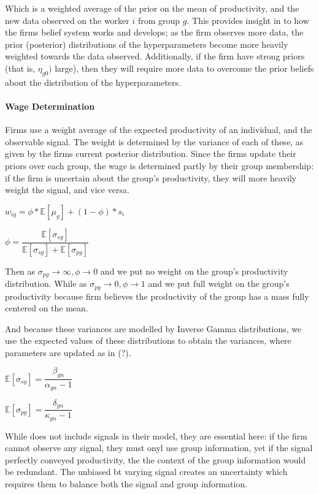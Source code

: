 \documentclass[]{article}
\begin{document}
Which is a weighted average of the prior on the mean of productivity, and the new data observed on the worker $i$ from group $g$. This provides insight in to how the firms belief system works and develops; as the firm observes more data, the prior (posterior) distributions of the hyperparameters become more heavily weighted towards the data observed. Additionally, if the firm have strong priors (that is, $\eta_{g0})$ large), then they will require more data to overcome the prior beliefs about the distribution of the hyperparameters.

\paragraph{Wage Determination}Firms use a weight average of the expected productivity of an individual, and the observable signal. The weight is determined by the variance of each of these, as given by the firms current posterior distribution. Since the firms update their priors over each group, the wage is determined partly by their group membership: if the firm is uncertain about the group's productivity, they will more heavily weight the signal, and vice versa.

\begin{center}
	$w_{ig} = \phi * \mathbb{E}[\mu_g] + (1 - \phi) * s_i$
	
	\vspace{0.2cm}
	$\phi = \dfrac{\mathbb{E}[\sigma_{sg}]}{\mathbb{E}[\sigma_{sg}]  + \mathbb{E}[\sigma_{pg}]}$
\end{center}
Then as $\sigma_{pg} \to \infty, \phi \to 0$ and we put no weight on the group's productivity distribution. While as $\sigma_{pg} \to 0, \phi \to 1$ and we put full weight on the group's productivity because firm believes the productivity of the group has a mass fully centered on the mean.

And because these variances are modelled by Inverse Gamma distributions, we use the expected values of these distributions to obtain the variances, where parameters are updated as in (?).

\begin{center}
	$\mathbb{E}[\sigma_{sg}] = \dfrac{\beta_{gn}}{\alpha_{gn} - 1}$
	\vspace{0.2cm}
	
	$\mathbb{E}[\sigma_{pg}] = \dfrac{\delta_{gn}}{\kappa_{gn} - 1}$
\end{center}

While \citet{Lepage2024} does not include signals in their model, they are essential here: if the firm cannot observe any signal, they must onyl use group information, yet if the signal perfectly conveyed productivity, the the context of the group information would be redundant. The unbiased bt varying signal creates an uncertainty which requires them to balance both the signal and group information.
\end{document}
